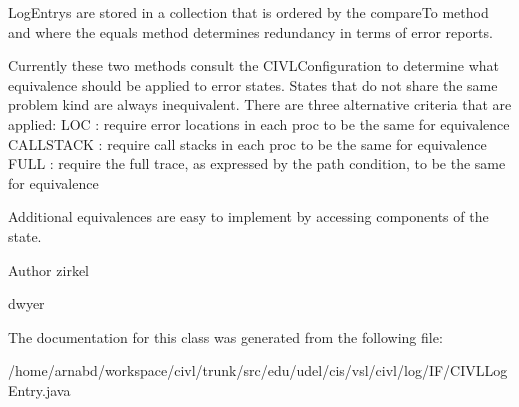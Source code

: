 Log\+Entry\textquotesingle{}s are stored in a collection that is ordered by the compare\+To method and where the equals method determines redundancy in terms of error reports.

Currently these two methods consult the C\+I\+V\+L\+Configuration to determine what equivalence should be applied to error states. States that do not share the same problem kind are always inequivalent. There are three alternative criteria that are applied\+: L\+O\+C \+: require error locations in each proc to be the same for equivalence C\+A\+L\+L\+S\+T\+A\+C\+K \+: require call stacks in each proc to be the same for equivalence F\+U\+L\+L \+: require the full trace, as expressed by the path condition, to be the same for equivalence

Additional equivalences are easy to implement by accessing components of the state.

\begin{DoxyAuthor}{Author}
zirkel 

dwyer 
\end{DoxyAuthor}


The documentation for this class was generated from the following file\+:\begin{DoxyCompactItemize}
\item 
/home/arnabd/workspace/civl/trunk/src/edu/udel/cis/vsl/civl/log/\+I\+F/C\+I\+V\+L\+Log\+Entry.\+java\end{DoxyCompactItemize}
